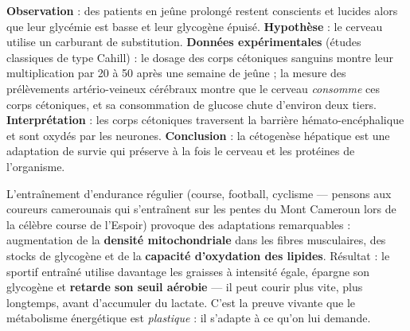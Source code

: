 \documentclass[11pt]{article}
\begin{document}
\begin{experience}
\textbf{Observation} : des patients en jeûne prolongé restent conscients et lucides alors que leur glycémie est basse et leur glycogène épuisé. \textbf{Hypothèse} : le cerveau utilise un carburant de substitution. \textbf{Données expérimentales} (études classiques de type Cahill) : le dosage des corps cétoniques sanguins montre leur multiplication par 20 à 50 après une semaine de jeûne ; la mesure des prélèvements artério-veineux cérébraux montre que le cerveau \emph{consomme} ces corps cétoniques, et sa consommation de glucose chute d'environ deux tiers. \textbf{Interprétation} : les corps cétoniques traversent la barrière hémato-encéphalique et sont oxydés par les neurones. \textbf{Conclusion} : la cétogenèse hépatique est une adaptation de survie qui préserve à la fois le cerveau et les protéines de l'organisme.
\end{experience}

\begin{savaistu}
L'entraînement d'endurance régulier (course, football, cyclisme — pensons aux coureurs camerounais qui s'entraînent sur les pentes du Mont Cameroun lors de la célèbre course de l'Espoir) provoque des adaptations remarquables : augmentation de la \textbf{densité mitochondriale} dans les fibres musculaires, des stocks de glycogène et de la \textbf{capacité d'oxydation des lipides}. Résultat : le sportif entraîné utilise davantage les graisses à intensité égale, épargne son glycogène et \textbf{retarde son seuil aérobie} — il peut courir plus vite, plus longtemps, avant d'accumuler du lactate. C'est la preuve vivante que le métabolisme énergétique est \emph{plastique} : il s'adapte à ce qu'on lui demande.
\end{savaistu}
\end{document}
